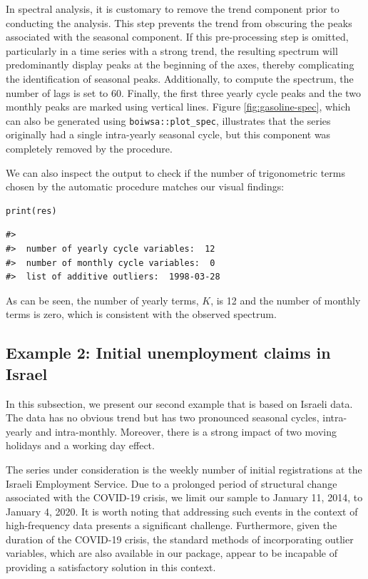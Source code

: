 In spectral analysis, it is customary to remove the trend component prior to conducting the analysis. This step prevents the trend from obscuring the peaks associated with the seasonal component. If this pre-processing step is omitted, particularly in a time series with a strong trend, the resulting spectrum will predominantly display peaks at the beginning of the axes, thereby complicating the identification of seasonal peaks. Additionally, to compute the spectrum, the number of lags is set to 60. Finally, the first three yearly cycle peaks and the two monthly peaks are marked using vertical lines. Figure \ref{fig:gasoline-spec}, which can also be generated using \texttt{boiwsa::plot\_spec}, illustrates that the series originally had a single intra-yearly seasonal cycle, but this component was completely removed by the procedure.

We can also inspect the output to check if the number of trigonometric terms chosen by the automatic procedure matches our visual findings:

\begin{verbatim}
print(res)
\end{verbatim}

\begin{verbatim}
#> 
#>  number of yearly cycle variables:  12 
#>  number of monthly cycle variables:  0 
#>  list of additive outliers:  1998-03-28
\end{verbatim}

As can be seen, the number of yearly terms, \(K\), is 12 and the number of monthly terms is zero, which is consistent with the observed spectrum.

\hypertarget{example-2-initial-unemployment-claims-in-israel}{%
\subsection{Example 2: Initial unemployment claims in Israel}\label{example-2-initial-unemployment-claims-in-israel}}

In this subsection, we present our second example that is based on Israeli data. The data has no obvious trend but has two pronounced seasonal cycles, intra-yearly and intra-monthly. Moreover, there is a strong impact of two moving holidays and a working day effect.

The series under consideration is the weekly number of initial registrations at the Israeli Employment Service. Due to a prolonged period of structural change associated with the COVID-19 crisis, we limit our sample to January 11, 2014, to January 4, 2020. It is worth noting that addressing such events in the context of high-frequency data presents a significant challenge. Furthermore, given the duration of the COVID-19 crisis, the standard methods of incorporating outlier variables, which are also available in our package, appear to be incapable of providing a satisfactory solution in this context.

